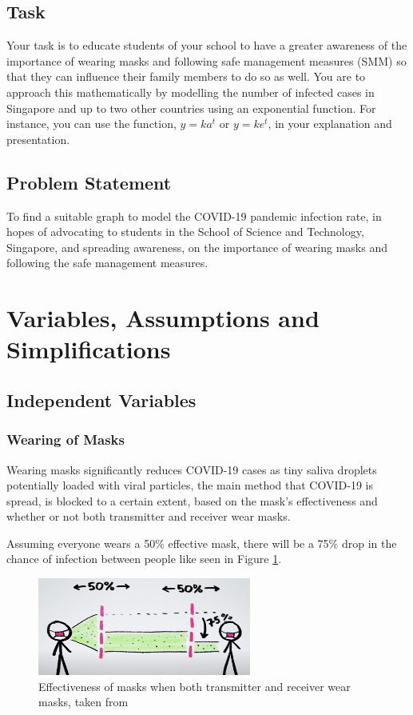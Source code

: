 \documentclass[a4paper,titlepage]{article}
\begin{document}
\subsection{Task}

Your task is to educate students of your school to have a greater awareness of the importance of wearing masks and following safe management measures (SMM) so that they can influence their family members to do so as well. You are to approach this mathematically by modelling the number of infected cases in Singapore and up to two other countries using an exponential function. For instance, you can use the function, $y=ka^t$ or $y=ke^t$, in your explanation and presentation.

\subsection{Problem Statement}

To find a suitable graph to model the COVID-19 pandemic infection rate, in hopes of advocating to students in the School of Science and Technology, Singapore, and spreading awareness, on the importance of wearing masks and following the safe management measures.

\pagebreak
\section{Variables, Assumptions and Simplifications}

\subsection{Independent Variables}

\subsubsection{Wearing of Masks}

Wearing masks significantly reduces COVID-19 cases as tiny saliva droplets potentially loaded with viral particles, the main method that COVID-19 is spread, is blocked to a certain extent, based on the mask's effectiveness and whether or not both transmitter and receiver wear masks.

Assuming everyone wears a 50\% effective mask, there will be a 75\% drop in the chance of infection between people \cite{masksim_bhatia_2020} like seen in Figure \ref{fig:mask2Effectiveness}.

\begin{figure}[htbp]
    \centering
    \includegraphics[width=7cm]{mask2Effectiveness.png}
    \caption{Effectiveness of masks when both transmitter and receiver wear masks, taken from \cite{maskvid_reich_2020}}
    \label{fig:mask2Effectiveness}
\end{figure}
\end{document}

